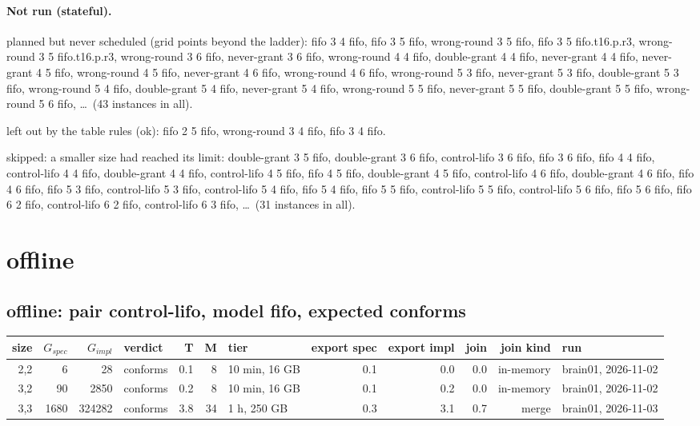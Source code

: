 \documentclass[10pt]{article}
\begin{document}
\paragraph{Not run (stateful).}
planned but never scheduled (grid points beyond the ladder): fifo 3 4 fifo, fifo 3 5 fifo, wrong-round 3 5 fifo, fifo 3 5 fifo.t16.p.r3, wrong-round 3 5 fifo.t16.p.r3, wrong-round 3 6 fifo, never-grant 3 6 fifo, wrong-round 4 4 fifo, double-grant 4 4 fifo, never-grant 4 4 fifo, never-grant 4 5 fifo, wrong-round 4 5 fifo, never-grant 4 6 fifo, wrong-round 4 6 fifo, wrong-round 5 3 fifo, never-grant 5 3 fifo, double-grant 5 3 fifo, wrong-round 5 4 fifo, double-grant 5 4 fifo, never-grant 5 4 fifo, wrong-round 5 5 fifo, never-grant 5 5 fifo, double-grant 5 5 fifo, wrong-round 5 6 fifo, \ldots\ (43 instances in all).\par
left out by the table rules (ok): fifo 2 5 fifo, wrong-round 3 4 fifo, fifo 3 4 fifo.\par
skipped: a smaller size had reached its limit: double-grant 3 5 fifo, double-grant 3 6 fifo, control-lifo 3 6 fifo, fifo 3 6 fifo, fifo 4 4 fifo, control-lifo 4 4 fifo, double-grant 4 4 fifo, control-lifo 4 5 fifo, fifo 4 5 fifo, double-grant 4 5 fifo, control-lifo 4 6 fifo, double-grant 4 6 fifo, fifo 4 6 fifo, fifo 5 3 fifo, control-lifo 5 3 fifo, control-lifo 5 4 fifo, fifo 5 4 fifo, fifo 5 5 fifo, control-lifo 5 5 fifo, control-lifo 5 6 fifo, fifo 5 6 fifo, fifo 6 2 fifo, control-lifo 6 2 fifo, control-lifo 6 3 fifo, \ldots\ (31 instances in all).\par
\section*{offline}
\subsection*{offline: pair \textsf{control-lifo}, model fifo, expected conforms}
\begin{longtable}{@{}rrrlrrlrrrrl@{}}
\toprule
size & $G_{\mathit{spec}}$ & $G_{\mathit{impl}}$ & verdict & T & M & tier & export spec & export impl & join & join kind & run \\
\midrule
\endhead
\color{red} 2,2 & 6 & 28 & conforms & 0.1 & 8 & 10 min, 16 GB & 0.1 & 0.0 & 0.0 & in-memory & brain01, 2026-11-02 \\
\color{red} 3,2 & 90 & 2850 & conforms & 0.2 & 8 & 10 min, 16 GB & 0.1 & 0.2 & 0.0 & in-memory & brain01, 2026-11-02 \\
\color{blue} 3,3 & 1680 & 324282 & conforms & 3.8 & 34 & 1 h, 250 GB & 0.3 & 3.1 & 0.7 & merge & brain01, 2026-11-03 \\
\bottomrule
\end{longtable}
\end{document}
